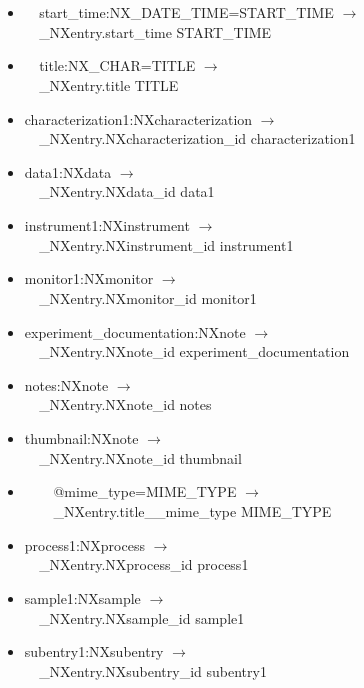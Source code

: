 \documentclass[11pt]{article}
\begin{document}
{{\begin{itemize}
\item{\verb|  |start\_time:NX\_DATE\_TIME=START\_TIME $\rightarrow$\\
\verb|  |\_NXentry.start\_time START\_TIME}

\item{\verb|  |title:NX\_CHAR=TITLE $\rightarrow$\\
\verb|  |\_NXentry.title TITLE}

\item{characterization1:NXcharacterization $\rightarrow$\\
\verb|  |\_NXentry.NXcharacterization\_id characterization1}

\item{data1:NXdata $\rightarrow$\\
\verb|  |\_NXentry.NXdata\_id data1}

\item{instrument1:NXinstrument $\rightarrow$\\
\verb|  |\_NXentry.NXinstrument\_id instrument1}

\item{monitor1:NXmonitor $\rightarrow$\\
\verb|  |\_NXentry.NXmonitor\_id monitor1}

\item{experiment\_documentation:NXnote $\rightarrow$\\
\verb|  |\_NXentry.NXnote\_id experiment\_documentation}

\item{notes:NXnote $\rightarrow$\\
\verb|  |\_NXentry.NXnote\_id notes}

\item{thumbnail:NXnote $\rightarrow$\\
\verb|  |\_NXentry.NXnote\_id thumbnail}

\item{\verb|    |@mime\_type=MIME\_TYPE $\rightarrow$\\
\verb|    |\_NXentry.title\_\_mime\_type MIME\_TYPE}

\item{process1:NXprocess $\rightarrow$\\
\verb|  |\_NXentry.NXprocess\_id process1}

\item{sample1:NXsample $\rightarrow$\\
\verb|  |\_NXentry.NXsample\_id sample1}

\item{subentry1:NXsubentry $\rightarrow$\\
\verb|  |\_NXentry.NXsubentry\_id subentry1}


\end{itemize}}}
\end{document}
